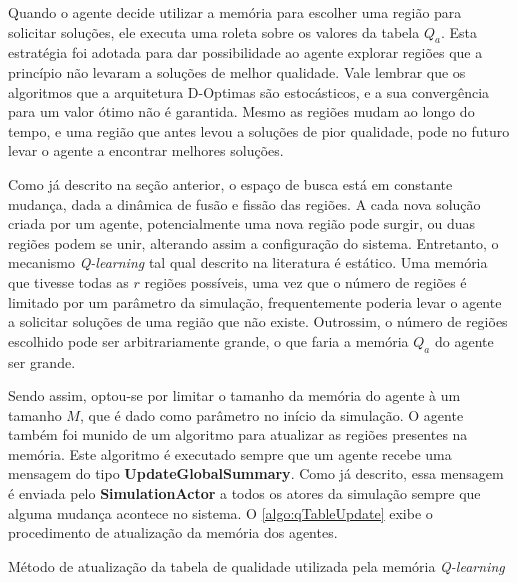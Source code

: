 Quando o agente decide utilizar a memória para escolher uma região para solicitar soluções, ele executa uma roleta sobre os valores da tabela $Q_a$. Esta estratégia foi adotada para dar possibilidade ao agente explorar regiões que a princípio não levaram a soluções de melhor qualidade. Vale lembrar que os algoritmos que a arquitetura D-Optimas são estocásticos, e a sua convergência para um valor ótimo não é garantida. Mesmo as regiões mudam ao longo do tempo, e uma região que antes levou a soluções de pior qualidade, pode no futuro levar o agente a encontrar melhores soluções.

Como já descrito na seção anterior, o espaço de busca está em constante mudança, dada a dinâmica de fusão e fissão das regiões. A cada nova solução criada por um agente, potencialmente uma nova região pode surgir, ou duas regiões podem se unir, alterando assim a configuração do sistema. Entretanto, o mecanismo \textit{Q-learning} tal qual descrito na literatura é estático. Uma memória que tivesse todas as $r$ regiões possíveis, uma vez que o número de regiões é limitado por um parâmetro da simulação, frequentemente poderia levar o agente a solicitar soluções de uma região que não existe. Outrossim, o número de regiões escolhido pode ser arbitrariamente grande, o que faria a memória $Q_a$ do agente ser grande. 

Sendo assim, optou-se por limitar o tamanho da memória do agente à um tamanho $M$, que é dado como parâmetro no início da simulação. O agente também foi munido de um algoritmo para atualizar as regiões presentes na memória. Este algoritmo é executado sempre que um agente recebe uma mensagem do tipo \textbf{UpdateGlobalSummary}. Como já descrito, essa mensagem é enviada pelo \textbf{SimulationActor} a todos os atores da simulação sempre que alguma mudança acontece no sistema. O \autoref{algo:qTableUpdate} exibe o procedimento de atualização da memória dos agentes.

\begin{algorithm}[H]
\caption{Método de atualização da tabela de qualidade utilizada pela memória \textit{Q-learning}}
\label{algo:qTableUpdate}
\begin{algorithmic}[1]
    \State {} 
\end{algorithmic}
\end{algorithm}

